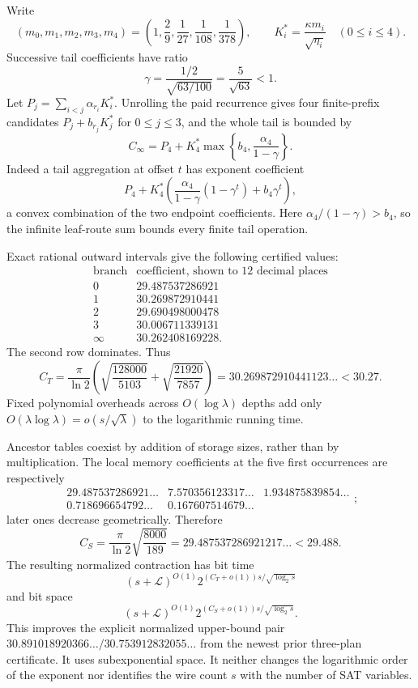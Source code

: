 Write
\[
 (m_0,m_1,m_2,m_3,m_4)=\left(1,\frac29,\frac1{27},
                                     \frac1{108},\frac1{378}\right),
 \qquad K_i^*=\frac{\kappa m_i}{\sqrt{\eta_i}}\quad(0\le i\le4).
\]
Successive tail coefficients have ratio
\[
 \gamma=\frac{1/2}{\sqrt{63/100}}=\frac5{\sqrt{63}}<1.
\]
Let $P_j=\sum_{i<j}\alpha_{r_i}K_i^*$. Unrolling the paid recurrence gives
four finite-prefix candidates $P_j+b_{r_j}K_j^*$ for $0\le j\le3$, and the
whole tail is bounded by
\[
 C_\infty=P_4+K_4^*
       \max\left\{b_4,\frac{\alpha_4}{1-\gamma}\right\}.
\]
Indeed a tail aggregation at offset $t$ has exponent coefficient
\[
 P_4+K_4^*\left(
 \frac{\alpha_4}{1-\gamma}(1-\gamma^t)+b_4\gamma^t\right),
\]
a convex combination of the two endpoint coefficients. Here
$\alpha_4/(1-\gamma)>b_4$, so the infinite leaf-route sum bounds every
finite tail operation.

Exact rational outward intervals give the following certified values:
\[
\begin{array}{c|l}
 \text{branch}&\text{coefficient, shown to 12 decimal places}\\ \hline
 0&29.487537286921\\
 1&30.269872910441\\
 2&29.690498000478\\
 3&30.006711339131\\
 \infty&30.262408169228.
\end{array}
\]
The second row dominates. Thus
\begin{equation}\label{eq:new-time-constant}
 C_T=\frac{\pi}{\ln2}\left(
        \sqrt{\frac{128000}{5103}}+
        \sqrt{\frac{21920}{7857}}\right)
 =30.269872910441123\ldots<30.27.
\end{equation}
Fixed polynomial overheads across $O(\log\lambda)$ depths add only
$O(\lambda\log\lambda)=o(s/\sqrt\lambda)$ to the logarithmic running time.

Ancestor tables coexist by addition of storage sizes, rather than by
multiplication. The local memory coefficients at the five first occurrences
are respectively
\[
 \begin{array}{ccccc}
29.487537286921\ldots & 7.570356123317\ldots & 1.934875839854\ldots \\
0.718696654792\ldots & 0.167607514679\ldots
\end{array};
\]
later ones decrease geometrically. Therefore
\begin{equation}\label{eq:new-space-constant}
 C_S=\frac{\pi}{\ln2}\sqrt{\frac{8000}{189}}
 =29.487537286921217\ldots<29.488.
\end{equation}
The resulting normalized contraction has bit time
\[
 (s+\mathcal L)^{O(1)}2^{(C_T+o(1))s/\sqrt{\log_2s}}
\]
and bit space
\[
 (s+\mathcal L)^{O(1)}2^{(C_S+o(1))s/\sqrt{\log_2s}}.
\]
This improves the explicit normalized upper-bound pair
$30.891018920366\ldots/30.753912832055\ldots$ from the newest prior
three-plan certificate. It uses subexponential space. It neither changes
the logarithmic order of the exponent nor identifies the wire count $s$
with the number of SAT variables.

